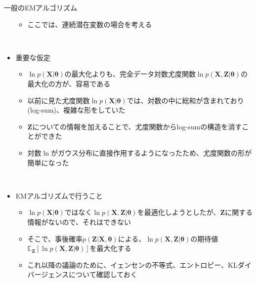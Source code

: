 \documentclass[dvipdfmx,notheorems,t]{beamer}
\begin{document}
\begin{frame}{一般のEMアルゴリズム}
\begin{itemize}
\begin{itemize}
		\item ここでは、連続潜在変数の場合を考える
	\end{itemize} \
	
	\item \alert{重要な仮定}
	\begin{itemize}
		\item $\ln p(\bm{X} | \bm{\theta})$の最大化よりも、完全データ対数尤度関数$\ln p(\bm{X}, \bm{Z} | \bm{\theta})$の最大化の方が、容易である
		\newline
		\item 以前に見た尤度関数$\ln p(\bm{X} | \bm{\theta})$では、対数の中に総和が含まれており(\alert{log-sum})、複雑な形をしていた
		\item $\bm{Z}$についての情報を加えることで、尤度関数からlog-sumの構造を消すことができた
		\item 対数$\ln$がガウス分布に直接作用するようになったため、尤度関数の形が簡単になった
	\end{itemize} \
	
	\item EMアルゴリズムで行うこと
	\begin{itemize}
		\item $\ln p(\bm{X} | \bm{\theta})$ではなく$\ln p(\bm{X}, \bm{Z} | \bm{\theta})$を最適化しようとしたが、$\bm{Z}$に関する情報がないので、それはできない
		\item そこで、事後確率$p(\bm{Z} | \bm{X}, \bm{\theta})$による、$\ln p(\bm{X}, \bm{Z} | \bm{\theta})$の期待値$\mathbb{E}_{\bm{Z}} \left[ \ln p(\bm{X}, \bm{Z} | \bm{\theta}) \right]$を最大化する
		\newline
		\item これ以降の議論のために、\alert{イェンセンの不等式}、\alert{エントロピー}、\alert{KLダイバージェンス}について確認しておく
	\end{itemize}
\end{itemize}

\end{frame}
\end{document}
